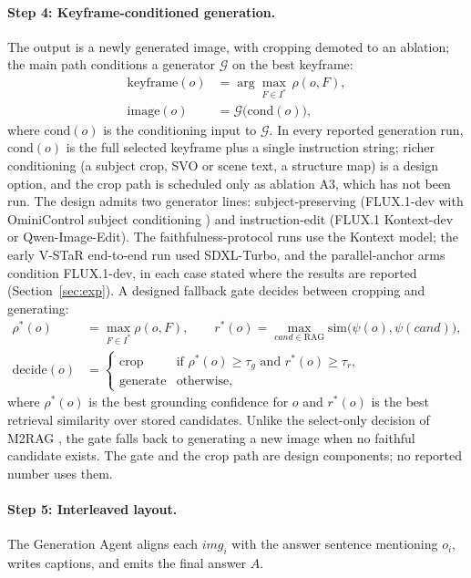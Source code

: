 \documentclass[10pt]{article}
\begin{document}
\paragraph{Step 4: Keyframe-conditioned generation.} The output is a newly generated image, with cropping demoted to an ablation; the main path conditions a generator $\mathcal{G}$ on the best keyframe:
\begin{align}
\mathrm{keyframe}(o) &= \arg\max_{F \in I^*}\, \rho(o,F), \\
\mathrm{image}(o) &= \mathcal{G}\big(\mathrm{cond}(o)\big),
\end{align}
where $\mathrm{cond}(o)$ is the conditioning input to $\mathcal{G}$. In every reported generation run, $\mathrm{cond}(o)$ is the full selected keyframe plus a single instruction string; richer conditioning (a subject crop, SVO or scene text, a structure map) is a design option, and the crop path is scheduled only as ablation A3, which has not been run. The design admits two generator lines: subject-preserving (FLUX.1-dev with OminiControl subject conditioning \citep{ominicontrol2411}) and instruction-edit (FLUX.1 Kontext-dev or Qwen-Image-Edit). The faithfulness-protocol runs use the Kontext model; the early V-STaR end-to-end run used SDXL-Turbo, and the parallel-anchor arms condition FLUX.1-dev, in each case stated where the results are reported (Section~\ref{sec:exp}). A designed fallback gate decides between cropping and generating:
\begin{align}
\rho^*(o) &= \max_{F \in I^*} \rho(o,F), \qquad r^*(o) = \max_{cand \in \mathrm{RAG}} \mathrm{sim}\big(\psi(o), \psi(cand)\big), \\
\mathrm{decide}(o) &= \begin{cases} \text{crop} & \text{if } \rho^*(o) \ge \tau_g \text{ and } r^*(o) \ge \tau_r, \\ \text{generate} & \text{otherwise}, \end{cases}
\end{align}
where $\rho^*(o)$ is the best grounding confidence for $o$ and $r^*(o)$ is the best retrieval similarity over stored candidates. Unlike the select-only decision of M2RAG \citep{m2rag2411}, the gate falls back to generating a new image when no faithful candidate exists. The gate and the crop path are design components; no reported number uses them.

\paragraph{Step 5: Interleaved layout.} The Generation Agent aligns each $img_i$ with the answer sentence mentioning $o_i$, writes captions, and emits the final answer $A$.
\end{document}
